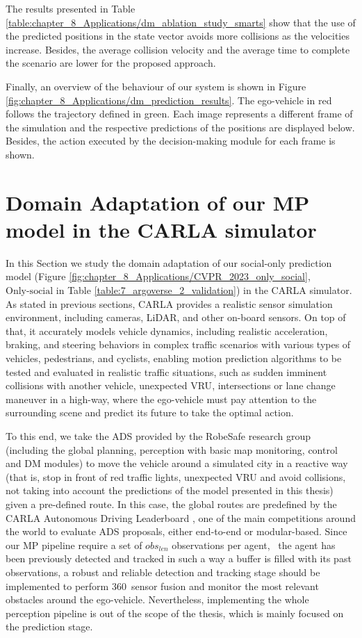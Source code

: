 The results presented in Table \ref{table:chapter_8_Applications/dm_ablation_study_smarts} show that the use of the predicted positions in the state vector avoids more collisions as the velocities increase. Besides, the average collision velocity and the average time to complete the scenario are lower for the proposed approach. 

Finally, an overview of the behaviour of our system is shown in Figure \ref{fig:chapter_8_Applications/dm_prediction_results}. The ego-vehicle in red follows the trajectory defined in green. Each image represents a different frame of the simulation and the respective predictions of the positions are displayed below. Besides, the action executed by the decision-making module for each frame is shown.

\section{Domain Adaptation of our MP model in the CARLA simulator}
\label{sec:8_domain_adaptation_carla}

In this Section we study the domain adaptation of our social-only prediction model (Figure \ref{fig:chapter_8_Applications/CVPR_2023_only_social}, \ie \ $\text{Only-social}$ in Table \ref{table:7_argoverse_2_validation}) in the \ac{CARLA} simulator. As stated in previous sections, \ac{CARLA} provides a realistic sensor simulation environment, including cameras, \ac{LiDAR}, and other on-board sensors. On top of that, it accurately models vehicle dynamics, including realistic acceleration, braking, and steering behaviors in complex traffic scenarios with various types of vehicles, pedestrians, and cyclists, enabling motion prediction algorithms to be tested and evaluated in realistic traffic situations, such as sudden imminent collisions with another vehicle, unexpected \ac{VRU}, intersections or lane change maneuver in a high-way, where the ego-vehicle must pay attention to the surrounding scene and predict its future to take the optimal action. 

To this end, we take the \ac{ADS} provided by the RobeSafe research group (including the global planning, perception with basic map monitoring, control and \ac{DM}  modules) to move the vehicle around a simulated city in a reactive way (that is, stop in front of red traffic lights, unexpected \ac{VRU} and avoid collisions, not taking into account the predictions of the model presented in this thesis) given a pre-defined route. In this case, the global routes are predefined by the \ac{CARLA} Autonomous Driving Leaderboard \cite{dosovitskiy2017carla}, one of the main competitions around the world to evaluate \ac{ADS} proposals, either end-to-end or modular-based. Since our \ac{MP} pipeline require a set of \textit{$obs_{len}$} observations per agent, \ie \ the agent has been previously detected and tracked in such a way a buffer is filled with its past observations, a robust and reliable detection and tracking stage should be implemented to perform 360\degree~sensor fusion and monitor the most relevant obstacles around the ego-vehicle. Nevertheless, implementing the whole perception pipeline is out of the scope of the thesis, which is mainly focused on the prediction stage.

